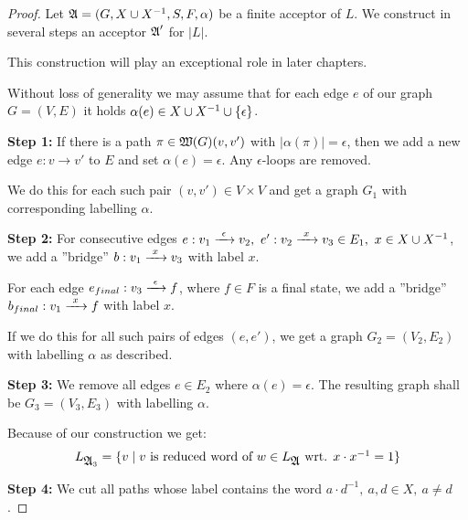 
\begin{proof}
Let $\mbox{$\mathfrak{A}$} = (G, X \cup {X}^{-1}, S, F, \alpha)$ be a finite acceptor of $L$. We
construct in several steps an acceptor $\mbox{$\mathfrak{A}$}'$ for $|L|$.

This construction will play an exceptional role in later chapters.

Without loss of generality we may assume that for each edge $e$ of our graph $G
= (V, E)$ it holds $\alpha(e) \in X \cup {X}^{-1} \cup \mbox{$\{\epsilon\}$}$.

{\bf Step 1:} If there is a path $\pi \in \mbox{$\mathfrak{W}(G)$}(v, v')$ with
$|\alpha(\pi)| = \epsilon$, then we add a new edge $e: v \to v'$ to $E$ and set
$\alpha(e) = \epsilon$. Any $\epsilon$-loops are removed.

\begin{center}

\end{center}

We do this for each such pair $(v, v')\in V \times V$ and get a graph $G_1$ with
corresponding labelling $\alpha$.

{\bf Step 2:} For consecutive edges $e: v_1 \xrightarrow{\ {\epsilon}\ } v_2,\ e': v_2
\xrightarrow{\ {x}\ } v_3 \in E_1,\ x \in X \cup {X}^{-1}$, we add a ''bridge'' $b: v_1 \xrightarrow{\ {x}\ }
v_3$ with label $x$.

For each edge $e_{final}: v_3 \xrightarrow{\ {\epsilon}\ } f$, where $f \in F$ is a final
state, we add a ''bridge'' $b_{final}: v_1 \xrightarrow{\ {x}\ } f$ with label $x$.

\begin{center}

\end{center}

If we do this for all such pairs of edges $(e, e')$, we get a graph
$G_2=(V_2,E_2)$ with labelling $\alpha$ as described.

{\bf Step 3:} We remove all edges $e \in E_2$ where $\alpha(e) = \epsilon$. The
resulting graph shall be $G_3=(V_3,E_3)$ with labelling $\alpha$.

Because of our construction we get:
\[ L_{\mbox{$\mathfrak{A}$}_3} = \mbox{$\{v \mid v \mbox{ is reduced word of } w \in
L_{\mbox{$\mathfrak{A}$}} \mbox{ wrt. } x \cdot x^{-1} = 1\}$} \]

{\bf Step 4:} We cut all paths whose label contains the word $a \cdot
d^{-1},\ a, d \in X,\ a \neq d$.


\end{proof}
